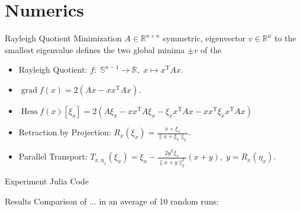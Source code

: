 \documentclass{beamer}
\begin{document}
\section{Numerics}

\begin{frame}{Rayleigh Quotient Minimization}
    $A \in \mathbb{R}^{n \times n}$ symmetric, eigenvector $v \in \mathbb{R}^n$ to the smallest eigenvalue defines the two global minima $\pm v$ of the
    \begin{itemize}
        \item Rayleigh Quotient: $f \colon \; \mathbb{S}^{n-1} \to \mathbb{R}, \; x \mapsto x^{\mathrm{T}} A x$.
        \item $\operatorname{grad} f(x) = 2(Ax - x x^{\mathrm{T}} A x)$.
        \item $\operatorname{Hess} f(x) [\xi_x] = 2 (A \xi_x - x x^{\mathrm{T}} A \xi_x - \xi_x x^{\mathrm{T}} A x - x x^{\mathrm{T}} \xi_x x^{\mathrm{T}} A x)$
        \item Retraction by Projection: $R_x (\xi_x) = \frac{x + \xi_x}{\lVert x + \xi_x \rVert_2}$.
        \item Parallel Transport: $T_{x, \eta_x}(\xi_x) = \xi_x - \frac{2 y^{\mathrm{T}} \xi_x}{\lVert x + y \rVert^{2}_2} (x + y), \; y = R_x(\eta_x)$.
    \end{itemize}
\end{frame}

\begin{frame}{Experiment}
    Julia Code %
\end{frame}

\begin{frame}{Results}
    Comparison of ... in an average of 10 random runs:
    \begin{table}[H]
    \end{table}
\end{frame}
\end{document}
